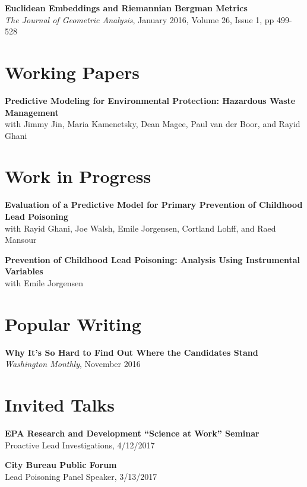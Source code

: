 \documentclass[margin,line]{resume}
\begin{document}
\begin{resume}
	{\bf Euclidean Embeddings and Riemannian Bergman Metrics} \\
        \textit{The Journal of Geometric Analysis}, January 2016, Volume 26, Issue 1, pp 499-528

        \section{\mysidestyle Working Papers}
        {\bf Predictive Modeling for Environmental Protection: Hazardous Waste Management}\\
        with Jimmy Jin, Maria Kamenetsky, Dean Magee, Paul van der Boor, and Rayid Ghani

        \section{\mysidestyle Work in Progress}
        {\bf Evaluation of a Predictive Model for Primary Prevention of Childhood Lead Poisoning}\\
        with Rayid Ghani, Joe Walsh, Emile Jorgensen, Cortland Lohff, and Raed Mansour

        {\bf Prevention of Childhood Lead Poisoning: Analysis Using Instrumental Variables}\\
        with Emile Jorgensen
        \section{\mysidestyle Popular Writing}
        {\bf Why It's So Hard to Find Out Where the Candidates Stand} \\
        \textit{Washington Monthly}, November 2016


	\section{\mysidestyle Invited Talks}
	{\bf EPA Research and Development ``Science at Work'' Seminar} \\
        Proactive Lead Investigations, 4/12/2017

	{\bf City Bureau Public Forum} \\
        Lead Poisoning Panel Speaker, 3/13/2017 


\end{resume}
\end{document}

